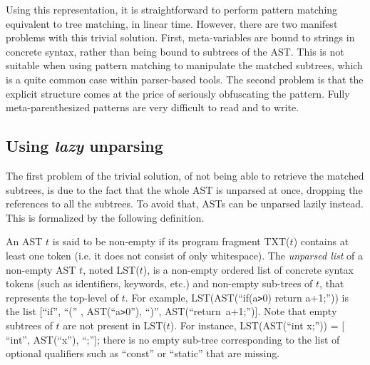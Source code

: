 \documentclass{sigplanconf}
\begin{document}
Using this representation, it is straightforward to perform pattern
matching equivalent to tree matching, in linear time.
However, there are two manifest problems with this trivial
solution. First, meta-variables are bound to strings in concrete
syntax, rather than being bound to subtrees of the AST. This is not
suitable when using pattern matching to manipulate the matched
subtrees, which is a quite common case within parser-based tools. The
second problem is that the explicit structure comes at the price of
seriously obfuscating the pattern.  Fully meta-parenthesized patterns
are very difficult to read and to write.

\subsection{Using {\em lazy} unparsing}
The first problem of the trivial solution, of not being able to
retrieve the matched subtrees, is due to the fact that the whole AST
is unparsed at once, dropping the references to all the subtrees. To
avoid that, ASTs can be unparsed lazily instead. This is formalized by
the following definition.

An AST $t$ is said to be non-empty if its program fragment TXT($t$)
contains at least one token (i.e. it does not consist of only
whitespace).  The {\em unparsed list} of a non-empty AST $t$, noted
LST($t$), is a non-empty ordered list of concrete syntax tokens (such
as identifiers, keywords, etc.) and non-empty sub-trees of $t$, that
represents the top-level of $t$. For example, LST(AST(``if(a\verb.>.0)
return a+1;'')) is the list [``if'', ``('' , AST(``a\verb.>.0''),
``)'', AST(``return\ a+1;'')]. Note that empty subtrees of $t$ are not
present in LST($t$). For instance, LST(AST(``int x;'')) = [ ``int'',
AST(``x''), ``;'']; there is no empty sub-tree corresponding to the
list of optional qualifiers such as ``const'' or ``static'' that are
missing.
\end{document}
